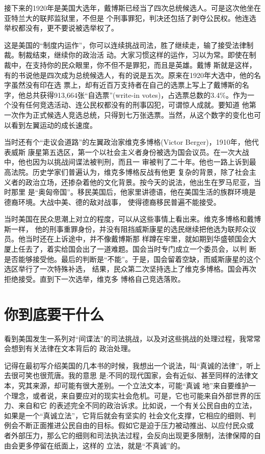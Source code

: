 \documentclass[10pt]{article}
\begin{document}
{接下来的1920年是美国大选年，戴博斯已经当了四次总统候选人。可是这次他坐在亚特兰大的联邦监狱里，不但是
个刑事罪犯，判决还包括了剥夺公民权。他连选举权都没有，更不要说被选举权了。

这是美国的``制度内运作''，你可以连续挑战司法，胜了继续走，输了接受法律制裁。制裁结束，继续你的政治活
动。大家习惯这样的运作，习以为常。即使在制裁中，在支持你的民众眼里，你不但不是罪犯，而且是英雄。戴博
斯就是这样，有的书说他是四次成为总统候选人，有的说是五次。原来在1920年大选中，他的名字虽然没有印在选
票上，却有近百万支持者在自己的选票上写上了戴博斯的名字，他总共获得913,664张``自选票''(write-in
votes)，占选票总数的3.4\%。作为一个没有任何竞选活动、连公民权都没有的刑事囚犯，可谓惊人成就。要知道
他第一次作为正式候选人竞选总统，只得到七万张选票。当然，从这个数字的变化也可以看到左翼运动的成长速度。

当时还有个``走议会道路''的左翼政治家维克多\textperiodcentered 博格(Victor Berger)，1910年，他代表威斯
康星第五选区，第一个以社会主义者身份被选为国会议员。在一次大战中，他也因为以挑战间谍法被判刑，而且一
审被判了二十年。他也一路上诉到最高法院。历史学家们普遍认为，维克多\textperiodcentered 博格反战有他更
复杂的背景，除了社会主义者的政治立场，还掺杂着他的文化背景。按今天的说法，他出生在罗马尼亚，当时那里
是``奥匈帝国''。移民美国后，他家里讲德语，他在美国生活的族群环境是德裔环境。大战中美、德的敌对战事，
使得德裔移民普遍不能接受。

当时美国在民众思潮上对立的程度，可以从这些事情上看出来。维克多\textperiodcentered 博格和戴博斯一样，
他的刑事重罪身份，并没有阻挡威斯康星的选民继续把他选为联邦众议员。他当时还在上诉途中，并不像戴博斯那
样蹲在牢里，就如期到华盛顿国会大厦上任去了，着实给国会出了一道难题。国会当时专门成立一个委员会，以判
断是否能够接受他。最后的判断是``不能''。于是，国会留着空缺，而威斯康星的这个选区举行了一次特殊补选，
结果，民众第二次坚持选上了维克多\textperiodcentered 博格。国会再次拒绝接受。直到下一次选举，维克多
\textperiodcentered 博格自己竞选落败。


\pagebreak
\section{你到底要干什么}

看到美国发生一系列对``间谍法''的司法挑战，以及对这些挑战的处理过程，我常常会想到有关法律在文本背后的
政治处理。

记得在最初写介绍美国的几本书的时候，我想出一个说法，叫``真诚的法律''，听上去很可笑也很荒唐。我的意思
是:不同的现代国家，会有近似、甚至同样的法律文本，究其来源，却可能有很大差别。一个立法文本，可能``真诚
地''来自要维护一个理念，或者说，来自要应对的现实社会危机。可是，它也可能来自外部世界的压力、来自和它
的表述完全不同的政治诉求。比如说，一个有关公民自由的立法，如果是一个``真诚立法''，它背后就会有坚实的
社会文化支撑，它相应的细则、判例会不断正面推进公民自由的目标。假如它是迫于压力被动推出、以应付民众或
者外部压力，那么它的细则和司法执法过程，会反向出现更多限制，法律保障的自由会更多停留在纸面上，这样的
立法，就是``不真诚''的。

}
\end{document}
